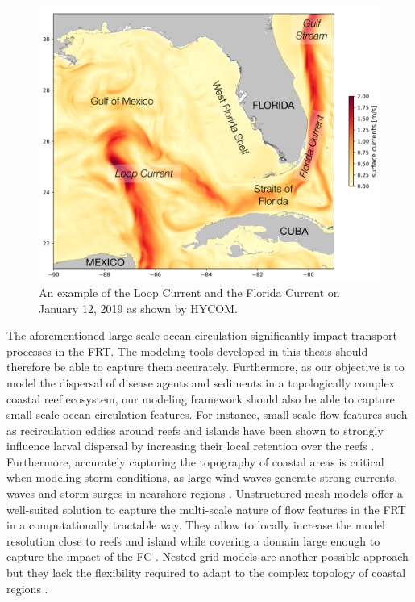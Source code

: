 \begin{figure}
	\centering
	\includegraphics[width=.9\textwidth]{chapters/intro/figures/fig_gom.png}
	\caption{An example of the Loop Current and the Florida Current on January 12, 2019 as shown by HYCOM.}
	\label{intro:gom}
\end{figure}

The aforementioned large-scale ocean circulation significantly impact transport processes in the FRT. The modeling tools developed in this thesis should therefore be able to capture them accurately. Furthermore, as our objective is to model the dispersal of disease agents and sediments in a topologically complex coastal reef ecosystem, our modeling framework should also be able to capture small-scale ocean circulation features. For instance, small-scale flow features such as recirculation eddies around reefs and islands have been shown to strongly influence larval dispersal by increasing their local retention over the reefs \citep{figueiredo2013synthesizing}. Furthermore, accurately capturing the topography of coastal areas is critical when modeling storm conditions, as large wind waves generate strong currents, waves and storm surges in nearshore regions \citep{dietrich2010high, weisberg2006hurricane}. Unstructured-mesh models offer a well-suited solution to capture the multi-scale nature of flow features in the FRT in a computationally tractable way. They allow to locally increase the model resolution close to reefs and island while covering a domain large enough to capture the impact of the FC \citep{lambrechts2008multi,frys2020fine}. Nested grid models are another possible approach \citep{warner2010development} but they lack the flexibility required to adapt to the complex topology of coastal regions \citep{fringer2019future}. 

